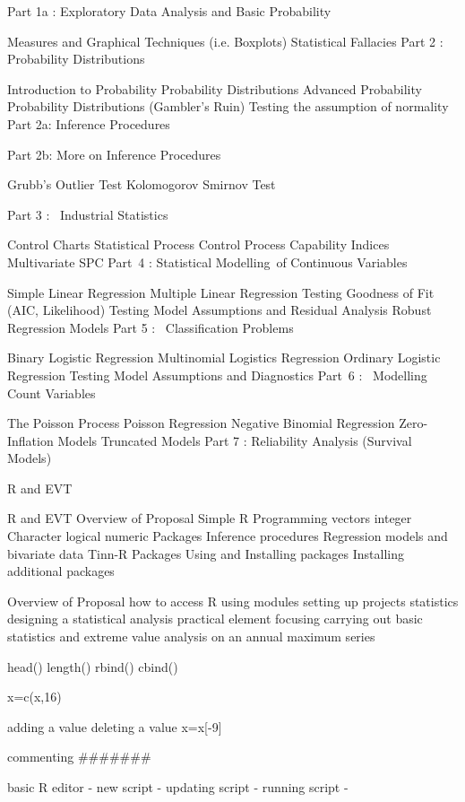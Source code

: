 \documentclass[a4paper,12pt]{article}
\begin{document}
\tableofcontents

Part 1a : Exploratory Data Analysis and Basic Probability

Measures and Graphical Techniques (i.e. Boxplots)
Statistical Fallacies
Part 2 : Probability Distributions

Introduction to Probability
Probability Distributions
Advanced Probability
Probability Distributions (Gambler's Ruin)
Testing the assumption of normality
Part 2a: Inference Procedures

Part 2b: More on Inference Procedures

Grubb's Outlier Test
Kolomogorov Smirnov Test


Part 3 :  Industrial Statistics

Control Charts
Statistical Process Control
Process Capability Indices
Multivariate SPC
Part 4 : Statistical Modelling of Continuous Variables

Simple Linear Regression
Multiple Linear Regression
Testing Goodness of Fit  (AIC, Likelihood)
Testing Model Assumptions and Residual Analysis
Robust Regression Models
Part 5 :  Classification Problems

Binary Logistic Regression
Multinomial Logistics Regression
Ordinary Logistic Regression
Testing Model Assumptions and Diagnostics
Part 6 :  Modelling Count Variables

The Poisson Process
Poisson Regression
Negative Binomial Regression
Zero-Inflation Models
Truncated Models
Part 7 : Reliability Analysis (Survival Models)






R and EVT

R and EVT
Overview of Proposal
Simple R Programming
vectors
integer
Character
logical
numeric
Packages
Inference procedures
Regression models and bivariate data
Tinn-R
Packages
Using and Installing packages
Installing additional packages

Overview of Proposal
how to access R
using modules
setting up projects
statistics
designing a statistical analysis
practical element focusing carrying out basic statistics and extreme value analysis on an annual maximum series
 
 
head()
length()
rbind()
cbind()

x=c(x,16)

adding a value
deleting a value
x=x[-9]

commenting #######


basic R editor
 - new script
 - updating script
 - running script
 -
\end{document}
